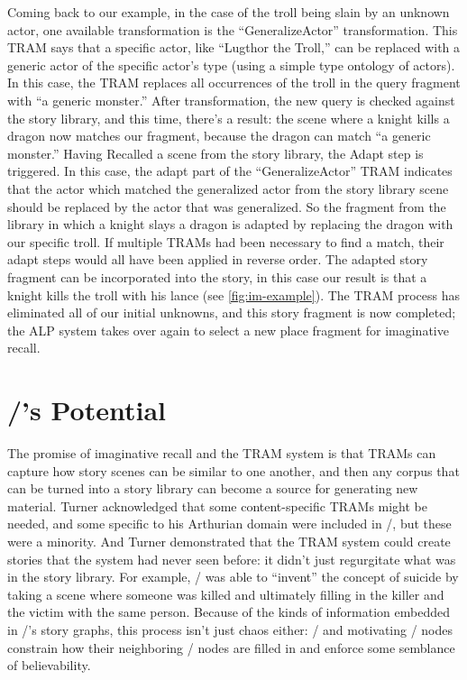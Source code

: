 Coming back to our example, in the case of the troll being slain by an unknown actor, one available transformation is the ``GeneralizeActor'' transformation.
%
This TRAM says that a specific actor, like ``Lugthor the Troll,'' can be replaced with a generic actor of the specific actor's type (using a simple type ontology of actors).
%
In this case, the TRAM replaces all occurrences of the troll in the query fragment with ``a generic monster.''
%
After transformation, the new query is checked against the story library, and this time, there's a result: the scene where a knight kills a dragon now matches our fragment, because the dragon can match ``a generic monster.''
%
Having Recalled a scene from the story library, the Adapt step is triggered.
%
In this case, the adapt part of the ``GeneralizeActor'' TRAM indicates that the actor which matched the generalized actor from the story library scene should be replaced by the actor that was generalized.
%
So the fragment from the library in which a knight slays a dragon is adapted by replacing the dragon with our specific troll.
%
If multiple TRAMs had been necessary to find a match, their adapt steps would all have been applied in reverse order.
%
The adapted story fragment can be incorporated into the story, in this case our result is that a knight kills the troll with his lance (see \cref{fig:im-example}).
%
The TRAM process has eliminated all of our initial unknowns, and this story fragment is now completed; the ALP system takes over again to select a new place fragment for imaginative recall.

\section{\minstrel/'s Potential}

The promise of imaginative recall and the TRAM system is that TRAMs can capture how story scenes can be similar to one another, and then any corpus that can be turned into a story library can become a source for generating new material.
%
Turner acknowledged that some content-specific TRAMs might be needed, and some specific to his Arthurian domain were included in \minstrel/, but these were a minority.
%
And Turner demonstrated that the TRAM system could create stories that the system had never seen before: it didn't just regurgitate what was in the story library.
%
For example, \minstrel/ was able to ``invent'' the concept of suicide by taking a scene where someone was killed and ultimately filling in the killer and the victim with the same person.
%
Because of the kinds of information embedded in \minstrel/'s story graphs, this process isn't just chaos either: \gng/ and motivating \gns/ nodes constrain how their neighboring \gna/ nodes are filled in and enforce some semblance of believability.


